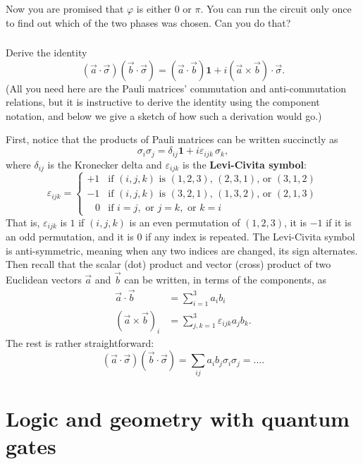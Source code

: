 \documentclass[fleqn]{article}
\let\oldsection\section
\renewcommand\section{\clearpage\oldsection}
\begin{document}
Now you are promised that \(\varphi\) is either \(0\) or \(\pi\).
You can run the circuit only once to find out which of the two phases was chosen.
Can you do that?

\hypertarget{section-12}{%
\subsubsection{}\label{section-12}}

Derive the identity
\[
  (\vec{a}\cdot\vec{\sigma})(\vec{b}\cdot\vec{\sigma})
  = (\vec{a}\cdot\vec{b})\mathbf{1}+ i(\vec{a}\times \vec{b})\cdot \vec{\sigma}.
\]
(All you need here are the Pauli matrices' commutation and anti-commutation relations, but it is instructive to derive the identity using the component notation, and below we give a sketch of how such a derivation would go.)

First, notice that the products of Pauli matrices can be written succinctly as
\[
 \sigma_{i}\sigma_{j}
 = \delta _{ij}\mathbf{1}+ i\varepsilon_{ijk}\,\sigma _{k},
\]
where \(\delta_{ij}\) is the Kronecker delta and \(\varepsilon_{ijk}\) is the \textbf{Levi-Civita symbol}:
\[
 \varepsilon_{ijk}
 = \begin{cases}
  +1 & {\text{if }}(i,j,k){\text{ is }}(1,2,3)\text{, }(2,3,1){\text{, or }}(3,1,2)
\\-1 & {\text{if }}(i,j,k){\text{ is }}(3,2,1)\text{, }(1,3,2){\text{, or }}(2,1,3)
\\\;\;\;0 & {\text{if }}i=j,{\text{ or }}j=k,{\text{ or }}k=i
\end{cases}
\]
That is, \(\varepsilon _{ijk}\) is \(1\) if \((i, j, k)\) is an even permutation of \((1, 2, 3)\), it is \(-1\) if it is an odd permutation, and it is \(0\) if any index is repeated.
The Levi-Civita symbol is anti-symmetric, meaning when any two indices are changed, its sign alternates.
Then recall that the scalar (dot) product and vector (cross) product of two Euclidean vectors \(\vec{a}\) and \(\vec{b}\) can be written, in terms of the components, as
\[
  \begin{aligned}
    \vec{a}\cdot\vec{b}
    &= \sum_{i=1}^3 a_i b_i
  \\(\vec{a}\times\vec{b})_i
    &= \sum_{j,k=1}^3 \varepsilon_{ijk}a_jb_k.
  \end{aligned}
\]
The rest is rather straightforward:
\[
  (\vec{a}\cdot\vec{\sigma})(\vec{b}\cdot\vec{\sigma})
  = \sum_{ij}a_i b_j\sigma_i\sigma_j
  = \ldots.
\]

\hypertarget{chapter3}{%
\section{Logic and geometry with quantum gates}\label{chapter3}}
\end{document}
